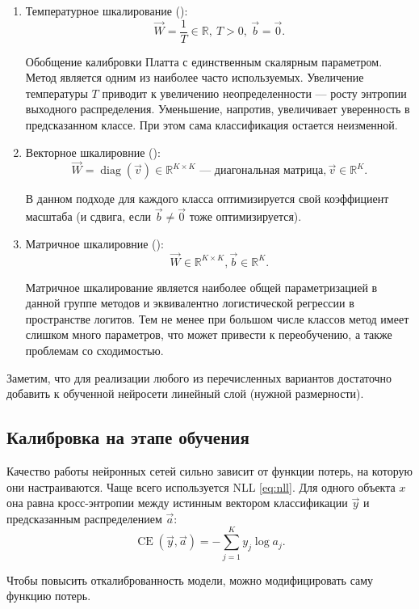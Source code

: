 \documentclass[12pt]{article}
\begin{document}
\begin{enumerate}
    \item Температурное шкалирование ():
    $$\vec{W}=\frac{1}{T}\in\mathbb{R}, \ T>0, \ \vec{b}=\vec{0}.$$
    
    Обобщение калибровки Платта с единственным скалярным параметром. Метод является одним из наиболее часто используемых. Увеличение температуры $T$ приводит к увеличению неопределенности --- росту энтропии выходного распределения. Уменьшение, напротив, увеличивает уверенность в предсказанном классе. При этом сама классификация остается неизменной.

    \item Векторное шкалировние ():
    $$\vec{W}=\operatorname{diag}(\vec{v})\in \mathbb{R}^{K\times K}\text{ --- диагональная матрица}, \vec{v}\in\mathbb{R}^K.$$

    В данном подходе для каждого класса оптимизируется свой коэффициент масштаба (и сдвига, если $\vec{b} \neq \vec{0}$ тоже оптимизируется).

    \item Матричное шкалировние ():
    $$\vec{W}\in \mathbb{R}^{K\times K}, \vec{b}\in\mathbb{R}^K.$$

    Матричное шкалирование является наиболее общей параметризацией в данной группе методов и эквивалентно логистической регрессии в пространстве логитов. Тем не менее при большом числе классов метод имеет слишком много параметров, что может привести к переобучению, а также проблемам со сходимостью.
\end{enumerate}
Заметим, что для реализации любого из перечисленных вариантов достаточно добавить к обученной нейросети линейный слой (нужной размерности).

\subsection{Калибровка на этапе обучения}
Качество работы нейронных сетей сильно зависит от функции потерь, на которую они настраиваются. Чаще всего используется NLL \eqref{eq:nll}. Для одного объекта $x$ она равна кросс-энтропии между истинным вектором классификации $\vec{y}$ и предсказанным распределением $\vec{a}$:
\begin{equation}
    \operatorname{CE}(\vec{y}, \vec{a}) = -\sum_{j=1}^{K} y_j \log{a_j}.
\end{equation}

Чтобы повысить откалиброванность модели, можно модифицировать саму функцию потерь.
\end{document}
